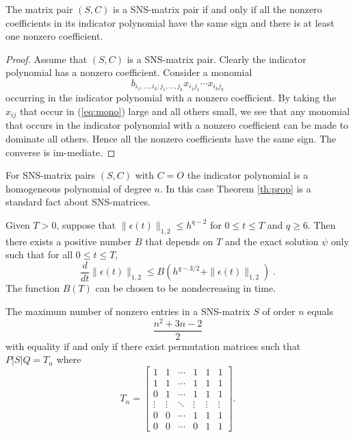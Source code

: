 \documentclass{svk_en}
\begin{document}
\begin{theorem} 
\label{th:prop} 
The matrix pair $(S,C)$ is a {\rm SNS}-matrix pair if and
only if all the nonzero coefficients in its indicator
polynomial have the same sign and there is at least one
nonzero coefficient.
\end{theorem} 
 
\begin{proof}
Assume that $(S,C)$ is a SNS-matrix pair.  Clearly the
indicator polynomial has a nonzero coefficient.  Consider a
monomial
\begin{equation} 
\label{eq:mono} 
b_{i_{1},\ldots,i_{k};j_{1},\ldots,j_{k}}x_{i_{1}j_{1}}\cdots
x_{i_{k}j_{k}}
\end{equation} 
occurring in the indicator polynomial with a nonzero
coefficient.  By taking the $x_{ij}$ that occur in
(\ref{eq:mono}) large and all others small, we see that any
monomial that occurs in the indicator polynomial with a
nonzero coefficient can be made to dominate all others.
Hence all the nonzero coefficients have the same sign. The
converse is im-\linebreak mediate. \qquad\end{proof} 
 

For SNS-matrix pairs $(S,C)$ with $C=O$ the indicator
polynomial is a homogeneous polynomial of degree $n$. In
this case Theorem \ref{th:prop} is a standard fact about
SNS-matrices.
 
\begin{lemma}[{\rm Stability}]
\label{stability}
Given $T>0$, suppose that $\| \epsilon (t) \|_{1,2} \leq h^{q-2}$
for $0 \leq t \leq T$ and $q \geq 6$. 
Then there exists a positive number $B$ that depends on
$T$ and the exact solution $\psi$ only such that for all $0 \leq t \leq T$,
\begin{equation}
\label{Gron}
\frac {d}{dt} \| \epsilon (t) \| _{1,2}  \leq B
   ( h^{q-3/2} + \| \epsilon (t) \|_{1,2})\;.
\end{equation}
The function $B(T)$ can be chosen to be nondecreasing in time.
\end{lemma}
 
 
\begin{theorem} 
\label{th:gibson} 
The maximum number of nonzero entries in a {\rm SNS}-matrix
$S$ of order $n$ equals \[\frac{n^{2}+3n-2}{2}\] with
equality if and only if there exist permutation matrices
such that $P|S|Q=T_{n}$ where
\begin{equation} 
\label{eq:gibson} 
T_{n}=\left[\begin{array}{cccccc} 1&1&\cdots&1&1&1\\
1&1&\cdots&1&1&1\\ 0&1&\cdots&1&1&1\\ 
\vdots&\vdots&\ddots&\vdots&\vdots&\vdots\\ 
0&0&\cdots&1&1&1\\ 0&0&\cdots&0&1&1\end{array}\right]. 
\end{equation} 
\end{theorem} 
 
\end{document}
